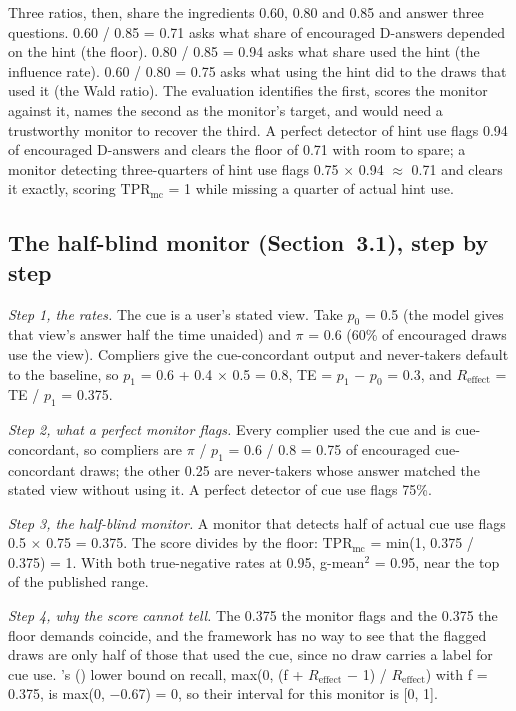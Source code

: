\documentclass[11pt,a4paper]{article}
\begin{document}
Three ratios, then, share the ingredients 0.60, 0.80 and 0.85 and answer three questions. 0.60 / 0.85 = 0.71 asks what share of encouraged D-answers depended on the hint (the floor). 0.80 / 0.85 = 0.94 asks what share used the hint (the influence rate). 0.60 / 0.80 = 0.75 asks what using the hint did to the draws that used it (the Wald ratio). The evaluation identifies the first, scores the monitor against it, names the second as the monitor’s target, and would need a trustworthy monitor to recover the third. A perfect detector of hint use flags 0.94 of encouraged D-answers and clears the floor of 0.71 with room to spare; a monitor detecting three-quarters of hint use flags 0.75 $\times$ 0.94 $\approx$ 0.71 and clears it exactly, scoring $\mathrm{TPR}_{\mathrm{mc}}$ = 1 while missing a quarter of actual hint use.

\setcounter{subsection}{1}
\subsection{The half-blind monitor (Section~3.1), step by step}
\emph{Step 1, the rates.} The cue is a user’s stated view. Take $p_0$ = 0.5 (the model gives that view’s answer half the time unaided) and $\pi$ = 0.6 (60\% of encouraged draws use the view). Compliers give the cue-concordant output and never-takers default to the baseline, so $p_1$ = 0.6 + 0.4 $\times$ 0.5 = 0.8, TE = $p_1$ $-$ $p_0$ = 0.3, and $R_{\mathrm{effect}}$ = TE / $p_1$ = 0.375.

\emph{Step 2, what a perfect monitor flags.} Every complier used the cue and is cue-concordant, so compliers are $\pi$ / $p_1$ = 0.6 / 0.8 = 0.75 of encouraged cue-concordant draws; the other 0.25 are never-takers whose answer matched the stated view without using it. A perfect detector of cue use flags 75\%.

\emph{Step 3, the half-blind monitor.} A monitor that detects half of actual cue use flags 0.5 $\times$ 0.75 = 0.375. The score divides by the floor: $\mathrm{TPR}_{\mathrm{mc}}$ = min(1, 0.375 / 0.375) = 1. With both true-negative rates at 0.95, g-mean$^2$ = 0.95, near the top of the published range.

\emph{Step 4, why the score cannot tell.} The 0.375 the monitor flags and the 0.375 the floor demands coincide, and the framework has no way to see that the flagged draws are only half of those that used the cue, since no draw carries a label for cue use. \citeauthor*{guan2026beyond}’s (\citeyear{guan2026beyond}) lower bound on recall, max(0, (f + $R_{\mathrm{effect}}$ $-$ 1) / $R_{\mathrm{effect}}$) with f = 0.375, is max(0, $-$0.67) = 0, so their interval for this monitor is [0, 1].
\end{document}
